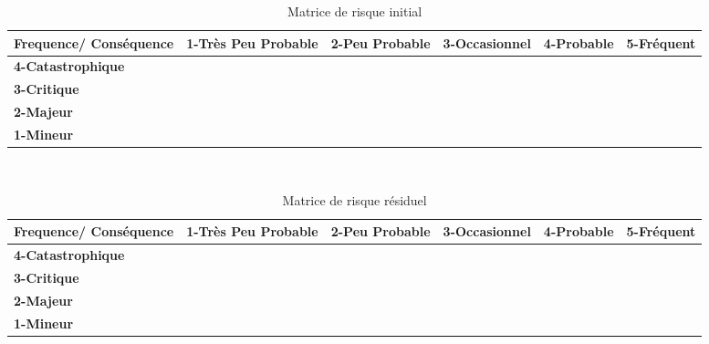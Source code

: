 \documentclass[12pt]{article}
\begin{document}
\begin{table}[H]
\centering
\scriptsize
\caption{Matrice de risque initial}
\begin{tabular}{|p{2cm}|p{2cm}|p{2cm}| p{2cm} |p{2cm}| p{2cm}|}
\hline \bf Frequence/ Conséquence & \bf 1-Très Peu Probable & \bf 2-Peu Probable & \bf 3-Occasionnel & \bf 4-Probable & \bf 5-Fréquent\\ [10pt]
\hline \bf 4-Catastrophique & \cellcolor{yellow!50} & \cellcolor{red!50} & \cellcolor{red!50} & \cellcolor{red!50} &\cellcolor{red!50} \\ [10pt]
\hline \bf 3-Critique &\cellcolor{green!50} & \cellcolor{yellow!50} & \cellcolor{yellow!50} & \cellcolor{red!50} &\cellcolor{red!50} \\ [10pt]
\hline \bf 2-Majeur & \cellcolor{green!50} & \cellcolor{green!50} & \cellcolor{yellow!50} &\cellcolor{yellow!50} &\cellcolor{red!50} \\ [10pt]
\hline \bf 1-Mineur & \cellcolor{green!50} & \cellcolor{green!50} & \cellcolor{green!50} &\cellcolor{yellow!50} &\cellcolor{yellow!50} \\ [10pt]
\hline
\end{tabular} \\
\end{table}

 

\begin{table}[H]
\centering
\scriptsize
\caption{Matrice de risque résiduel}
\begin{tabular}{|p{2cm}|p{2cm}|p{2cm}| p{2cm} |p{2cm}| p{2cm}|}
\hline \bf Frequence/ Conséquence & \bf 1-Très Peu Probable & \bf 2-Peu Probable & \bf 3-Occasionnel & \bf 4-Probable & \bf 5-Fréquent\\ [10pt]
\hline \bf 4-Catastrophique & \cellcolor{yellow!50} & \cellcolor{red!50} & \cellcolor{red!50} & \cellcolor{red!50} &\cellcolor{red!50} \\ [10pt]
\hline \bf 3-Critique &\cellcolor{green!50} & \cellcolor{yellow!50} & \cellcolor{yellow!50} & \cellcolor{red!50} &\cellcolor{red!50} \\ [10pt]
\hline \bf 2-Majeur & \cellcolor{green!50} & \cellcolor{green!50} & \cellcolor{yellow!50} &\cellcolor{yellow!50} &\cellcolor{red!50} \\ [10pt]
\hline \bf 1-Mineur & \cellcolor{green!50} & \cellcolor{green!50} & \cellcolor{green!50} &\cellcolor{yellow!50} &\cellcolor{yellow!50} \\ [10pt]
\hline
\end{tabular} \\
\end{table}
\end{document}
